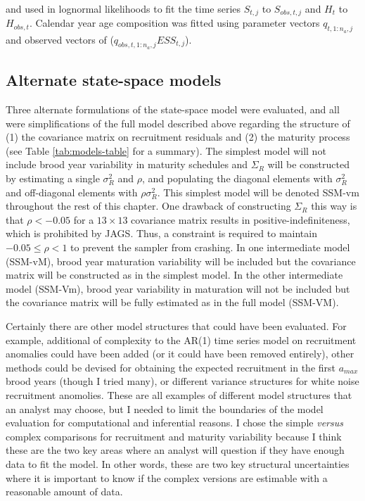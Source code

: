 \documentclass[12pt,]{book}
\theoremstyle{definition}
\theoremstyle{definition}
\theoremstyle{definition}
\theoremstyle{remark}
\begin{document}
\noindent
and used in lognormal likelihoods to fit the time series \(S_{t,j}\) to
\(S_{obs,t,j}\) and \(H_t\) to \(H_{obs,t}\). Calendar year age
composition was fitted using parameter vectors \(q_{t,1:n_a,j}\) and
observed vectors of (\(q_{obs,t,1:n_a,j} ESS_{t,j}\)).

\subsection{Alternate state-space models}\label{alt-ssm-models}

\noindent
Three alternate formulations of the state-space model were evaluated,
and all were simplifications of the full model described above regarding
the structure of (1) the covariance matrix on recruitment residuals and
(2) the maturity process (see Table \ref{tab:models-table} for a
summary). The simplest model will not include brood year variability in
maturity schedules and \(\Sigma_R\) will be constructed by estimating a
single \(\sigma_R^2\) and \(\rho\), and populating the diagonal elements
with \(\sigma_R^2\) and off-diagonal elements with \(\rho \sigma_R^2\).
This simplest model will be denoted SSM-vm throughout the rest of this
chapter. One drawback of constructing \(\Sigma_R\) this way is that
\(\rho < -0.05\) for a \(13 \times 13\) covariance matrix results in
positive-indefiniteness, which is prohibited by JAGS. Thus, a constraint
is required to maintain \(-0.05 \le \rho < 1\) to prevent the sampler
from crashing. In one intermediate model (SSM-vM), brood year maturation
variability will be included but the covariance matrix will be
constructed as in the simplest model. In the other intermediate model
(SSM-Vm), brood year variability in maturation will not be included but
the covariance matrix will be fully estimated as in the full model
(SSM-VM).

Certainly there are other model structures that could have been
evaluated. For example, additional of complexity to the AR(1) time
series model on recruitment anomalies could have been added (or it could
have been removed entirely), other methods could be devised for
obtaining the expected recruitment in the first \(a_{max}\) brood years
(though I tried many), or different variance structures for white noise
recruitment anomolies. These are all examples of different model
structures that an analyst may choose, but I needed to limit the
boundaries of the model evaluation for computational and inferential
reasons. I chose the simple \emph{versus} complex comparisons for
recruitment and maturity variability because I think these are the two
key areas where an analyst will question if they have enough data to fit
the model. In other words, these are two key structural uncertainties
where it is important to know if the complex versions are estimable with
a reasonable amount of data.
\end{document}
